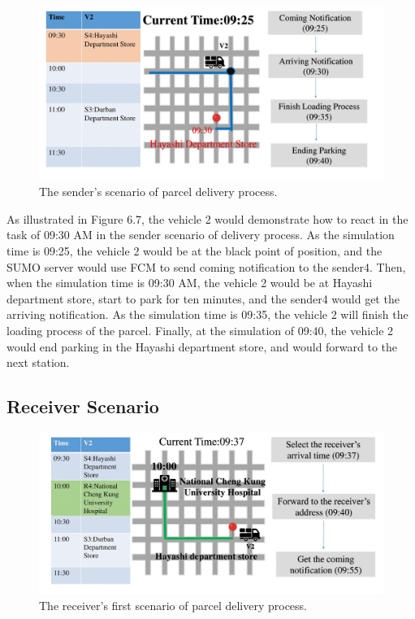 \documentclass[12pt]{ksthesis}
\begin{document}
\begin{thesis}
{\begin{figure}[H]
\centering
\includegraphics[width=1.14\textwidth]{./Thesis_figures/F6-7_senderScenario.PNG}
\caption{\large The sender's scenario of parcel delivery process.}
\vspace{0.5cm}
\label{Fig:senderScenario_DeliveryPorcess}
\end{figure}

As illustrated in Figure 6.7, the vehicle 2 would demonstrate how to react in the task of 09:30 AM in the sender scenario of delivery process. As the simulation time is 09:25, the vehicle 2 would be at the black point of position, and the SUMO server would use FCM to send coming notification to the sender4. Then, when the simulation time is 09:30 AM, the vehicle 2 would be at Hayashi department store, start to park for ten minutes, and the sender4 would get the arriving notification.
As the simulation time is 09:35, the vehicle 2 will finish the loading process of the parcel. Finally, at the simulation of 09:40, the vehicle 2 would end parking in the Hayashi department store, and would forward to the next station.

\subsection{Receiver Scenario}

\begin{figure}[H]
\centering
\includegraphics[width=1.14\textwidth]{./Thesis_figures/F6-8_receiverScenario1.PNG}
\caption{\large The receiver's first scenario of parcel delivery process.}
\vspace{0.5cm}
\label{Fig:FirsrtReceiverScenario_deliveryProcess}
\end{figure}

}
\end{thesis}
\end{document}
